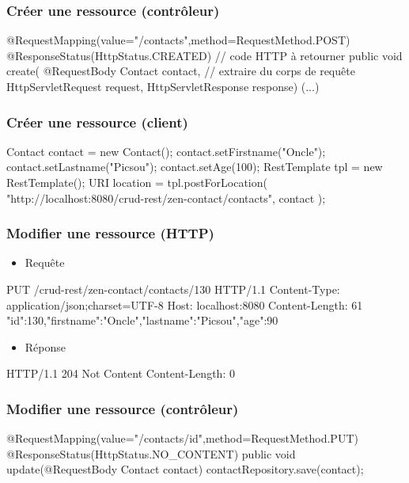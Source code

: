 \begin{frame}[fragile]
 \frametitle{Créer une ressource (contrôleur)}
 
 \begin{javacode}
@RequestMapping(value="/contacts",method=RequestMethod.POST)
@ResponseStatus(HttpStatus.CREATED)  // code HTTP \`a retourner
public void create(
      @RequestBody Contact contact,  // extraire du corps de requ\^ete
      HttpServletRequest request, 
      HttpServletResponse response) {
  (...)
}
 \end{javacode}  

\end{frame}

\begin{frame}[fragile]
 \frametitle{Créer une ressource (client)}
 
 \begin{javacode}
Contact contact = new Contact();
contact.setFirstname("Oncle");
contact.setLastname("Picsou");
contact.setAge(100);
RestTemplate tpl = new RestTemplate();
URI location = tpl.postForLocation(
  "http://localhost:8080/crud-rest/zen-contact/contacts",
  contact
);
 \end{javacode}  

\end{frame}

\begin{frame}[fragile]
 \frametitle{Modifier une ressource (HTTP)}
 
 \begin{itemize}
  \item Requête
 \end{itemize} 
 
 \begin{textcode}
PUT /crud-rest/zen-contact/contacts/130 HTTP/1.1
Content-Type: application/json;charset=UTF-8
Host: localhost:8080
Content-Length: 61
{"id":130,"firstname":"Oncle","lastname":"Picsou","age":90}
 \end{textcode}
 
  \begin{itemize}
  \item Réponse
 \end{itemize} 
 
 \begin{textcode}
HTTP/1.1 204 Not Content
Content-Length: 0
 \end{textcode}

\end{frame}

\begin{frame}[fragile]
 \frametitle{Modifier une ressource (contrôleur)}
 
 \begin{javacode}
@RequestMapping(value="/contacts/{id}",method=RequestMethod.PUT)
@ResponseStatus(HttpStatus.NO_CONTENT)
public void update(@RequestBody Contact contact) {
  contactRepository.save(contact);
}
 \end{javacode}  

\end{frame}

